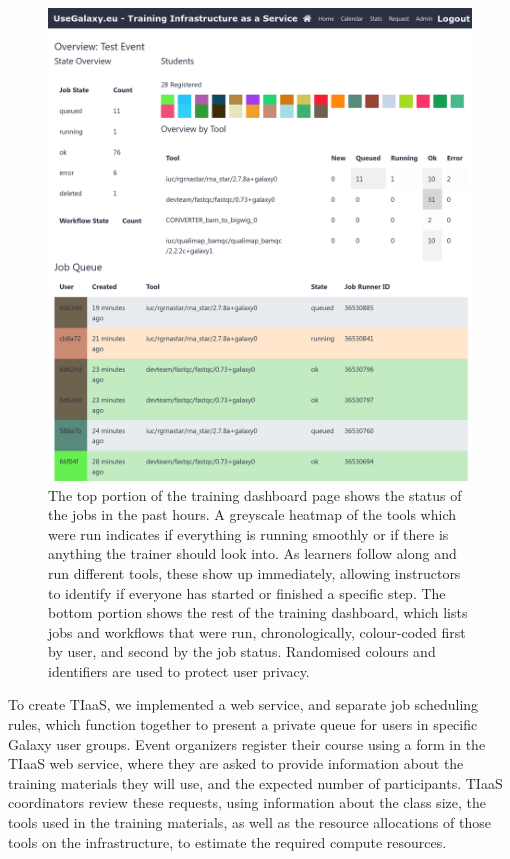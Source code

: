 \documentclass[a4paper,num-refs]{oup-contemporary}
\begin{document}
\begin{figure}[bt!]
\centering
\includegraphics[width=\linewidth]{images/dashboard.png}
\caption{The top portion of the training dashboard page shows the status of the jobs in the past hours. A greyscale heatmap of the tools which were run indicates if everything is running smoothly or if there is anything the trainer should look into. As learners follow along and run different tools, these show up immediately, allowing instructors to identify if everyone has started or finished a specific step. The bottom portion shows the rest of the training dashboard, which lists jobs and workflows that were run, chronologically, colour-coded first by user, and second by the job status. Randomised colours and identifiers are used to protect user privacy.}\label{figure:dashboard}
\end{figure}

To create TIaaS, we implemented a web service, and separate job scheduling rules, which function together to present a private queue for users in specific Galaxy user groups. Event organizers register their course using a form in the TIaaS web service, where they are asked to provide information about the training  materials they will use, and the expected number of participants. TIaaS coordinators  review these requests, using information about the class size, the tools used in the training materials, as well as the resource allocations of those tools on the infrastructure, to estimate the required compute resources.
\end{document}
